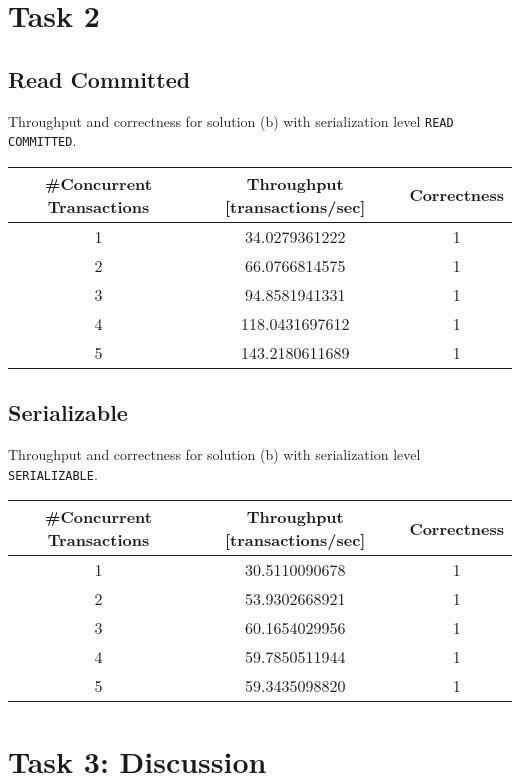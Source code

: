 \documentclass[11pt]{scrartcl}
\begin{document}
\medskip

\section*{Task 2}

\subsection*{Read Committed}

Throughput and correctness for solution (b) with serialization level
{\tt\small READ COMMITTED}.

\bigskip

\begin{tabular}{c|c|c}
  \#Concurrent Transactions & Throughput [transactions/sec] & Correctness
  \\\hline
  1 & 34.0279361222 & 1\\
  2 & 66.0766814575 & 1\\
  3 & 94.8581941331 & 1\\
  4 & 118.0431697612 & 1\\
  5 & 143.2180611689 & 1\\    
\end{tabular}

\medskip

\subsection*{Serializable}

Throughput and correctness for solution (b) with serialization level
{\tt\small SERIALIZABLE}.

\bigskip

\begin{tabular}{c|c|c}
  \#Concurrent Transactions & Throughput [transactions/sec] & Correctness
  \\\hline
  1 & 30.5110090678 & 1\\
  2 & 53.9302668921 & 1\\
  3 & 60.1654029956 & 1\\
  4 & 59.7850511944 & 1\\
  5 & 59.3435098820 & 1\\    
\end{tabular}

\medskip

\section*{Task 3: Discussion}
\end{document}
